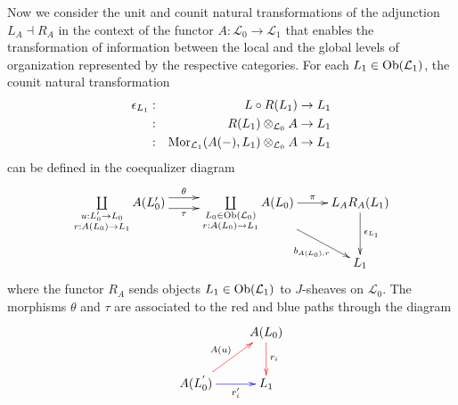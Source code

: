 \documentclass[aps,twocolumn]{revtex4-1}
\begin{document}
Now we consider the unit and counit natural transformations of the adjunction $L_A \dashv R_A$ in the context of the functor $A: \mathcal{L}_0 \rightarrow \mathcal{L}_1$ that enables the transformation of information between the local and the global levels of organization represented by the respective categories. For each $L_1 \in \mathop{\rm Ob}\nolimits(\mathcal{L}_1)$, the counit natural transformation
\begin{eqnarray*}
\epsilon_{L_1} &:& L \circ R(L_1) \rightarrow L_1\\
&:& R(L_1) \otimes_{\mathcal{L}_0} A \rightarrow L_1\\
&:& \mathop{\rm Mor}\nolimits_{\mathcal{L}_1}(A(-),L_1) \otimes_{\mathcal{L}_0} A \rightarrow L_1
\end{eqnarray*}
can be defined in the coequalizer diagram
\begin{displaymath}
\xymatrix{
\coprod\limits_{\substack{u : L'_0 \rightarrow L_0 \\ r:A(L_0) \rightarrow L_1}}
A(L'_0)
\ar@<1ex>[r]^-{\theta} \ar@<-1ex>[r]_-{\tau}
&
\coprod\limits_{\substack{L_0 \in \Ob(\mathcal{L}_0) \\ r:A(L_0) \rightarrow L_1}}
A(L_0)
\ar[r]^-{\pi} \ar[dr]_-{b_{A(L_0),r}}
&
L_A R_A(L_1) \ar[d]^-{\epsilon_{L_1}}\\
& & L_1
}
\end{displaymath}
where the functor $R_A$ sends objects $L_1 \in \mathop{\rm Ob}\nolimits(\mathcal{L}_1)$ to $J$-sheaves on $\mathcal{L}_0$. The morphisms $\theta$ and $\tau$ are associated to the red and blue paths through the diagram
\begin{displaymath}
\xymatrix{
& A(L_0) \ar@[red][d]^{r_i} \\
A(L_0^{'}) \ar@[red][ur]^{A(u)} \ar@[blue][r]_-{r'_i} & L_1
}
\end{displaymath}
\end{document}
